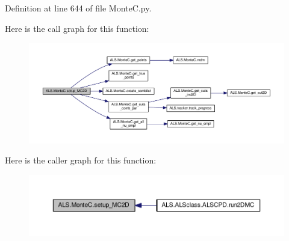 Definition at line 644 of file Monte\+C.\+py.



Here is the call graph for this function\+:
\nopagebreak
\begin{figure}[H]
\begin{center}
\leavevmode
\includegraphics[width=350pt]{namespace_a_l_s_1_1_monte_c_aec5be61bfee29797502d1274f9a9af2b_cgraph}
\end{center}
\end{figure}




Here is the caller graph for this function\+:
\nopagebreak
\begin{figure}[H]
\begin{center}
\leavevmode
\includegraphics[width=350pt]{namespace_a_l_s_1_1_monte_c_aec5be61bfee29797502d1274f9a9af2b_icgraph}
\end{center}
\end{figure}


